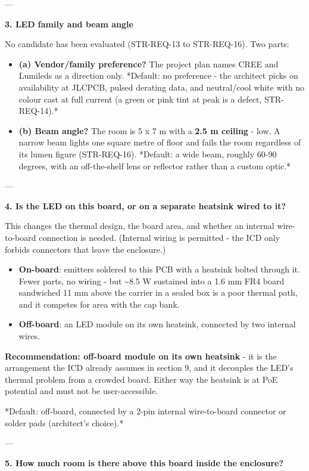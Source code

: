 \documentclass[11pt,a4paper]{article}
\begin{document}
---

\textbf{3. LED family and beam angle}

No candidate has been evaluated (STR-REQ-13 to STR-REQ-16). Two parts:

\begin{itemize}
\item \textbf{(a) Vendor/family preference?} The project plan names CREE and Lumileds as a direction
only. {*}Default: no preference - the architect picks on availability at JLCPCB, pulsed
derating data, and neutral/cool white with no colour cast at full current (a green or pink
tint at peak is a defect, STR-REQ-14).{*}
\item \textbf{(b) Beam angle?} The room is 5 x 7 m with a \textbf{2.5 m ceiling} - low. A narrow beam lights
one square metre of floor and fails the room regardless of its lumen figure (STR-REQ-16).
{*}Default: a wide beam, roughly 60-90 degrees, with an off-the-shelf lens or reflector rather
than a custom optic.{*}
\end{itemize}
---

\textbf{4. Is the LED on this board, or on a separate heatsink wired to it?}

This changes the thermal design, the board area, and whether an internal wire-to-board connection is needed. (Internal wiring is permitted - the ICD only forbids connectors that leave the enclosure.)

\begin{itemize}
\item \textbf{On-board}: emitters soldered to this PCB with a heatsink bolted through it. Fewer parts,
no wiring - but \textasciitilde{}8.5 W sustained into a 1.6 mm FR4 board sandwiched 11 mm above the carrier
in a sealed box is a poor thermal path, and it competes for area with the cap bank.
\item \textbf{Off-board}: an LED module on its own heatsink, connected by two internal wires.
\end{itemize}
\textbf{Recommendation: off-board module on its own heatsink} - it is the arrangement the ICD already assumes in section 9, and it decouples the LED's thermal problem from a crowded board. Either way the heatsink is at PoE potential and must not be user-accessible.

{*}Default: off-board, connected by a 2-pin internal wire-to-board connector or solder pads (architect's choice).{*}

---

\textbf{5. How much room is there above this board inside the enclosure?}
\end{document}
